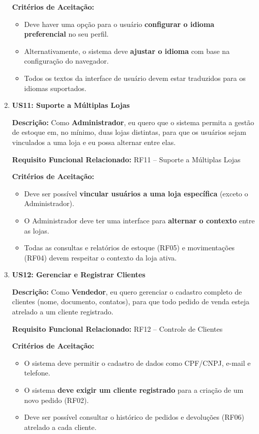\documentclass[
	12pt,				%
	openany,			%
	twoside,			%
	a4paper,			%
	english,			%
	brazil				%
	]{abntex2}
\begin{document}
\begin{enumerate}
\textbf{Crit\'erios de Aceita\c{c}\~ao:}
\begin{itemize}
  \item Deve haver uma opção para o usuário \textbf{configurar o idioma preferencial} no seu perfil.
  \item Alternativamente, o sistema deve \textbf{ajustar o idioma} com base na configuração do navegador.
  \item Todos os textos da interface de usuário devem estar traduzidos para os idiomas suportados.
\end{itemize}

\item \textbf{US11: Suporte a Múltiplas Lojas}

\textbf{Descri\c{c}\~ao:} Como \textbf{Administrador}, eu quero que o sistema permita a gestão de estoque em, no mínimo, duas lojas distintas, para que os usuários sejam vinculados a uma loja e eu possa alternar entre elas.

\textbf{Requisito Funcional Relacionado:} RF11 -- Suporte a Múltiplas Lojas

\textbf{Crit\'erios de Aceita\c{c}\~ao:}
\begin{itemize}
  \item Deve ser possível \textbf{vincular usuários a uma loja específica} (exceto o Administrador).
  \item O Administrador deve ter uma interface para \textbf{alternar o contexto} entre as lojas.
  \item Todas as consultas e relatórios de estoque (RF05) e movimentações (RF04) devem respeitar o contexto da loja ativa.
\end{itemize}

\item \textbf{US12: Gerenciar e Registrar Clientes}

\textbf{Descri\c{c}\~ao:} Como \textbf{Vendedor}, eu quero gerenciar o cadastro completo de clientes (nome, documento, contatos), para que todo pedido de venda esteja atrelado a um cliente registrado.

\textbf{Requisito Funcional Relacionado:} RF12 -- Controle de Clientes

\textbf{Crit\'erios de Aceita\c{c}\~ao:}
\begin{itemize}
  \item O sistema deve permitir o cadastro de dados como CPF/CNPJ, e-mail e telefone.
  \item O sistema \textbf{deve exigir um cliente registrado} para a criação de um novo pedido (RF02).
  \item Deve ser possível consultar o histórico de pedidos e devoluções (RF06) atrelado a cada cliente.
\end{itemize}


\end{enumerate}
\end{document}
